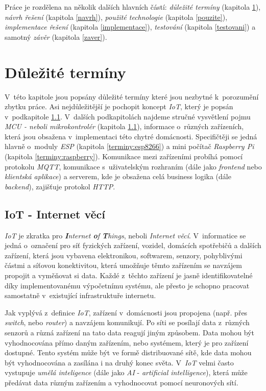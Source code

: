 Práce je rozdělena na několik dalších hlavních částí:
\emph{důležité termíny} (kapitola \ref{terminy}),
\emph{návrh řešení} (kapitola \ref{navrh}),
\emph{použité technologie} (kapitola \ref{pouzite}),
\emph{implementace řešení} (kapitola \ref{implementace}),
\emph{testování} (kapitola \ref{testovani})
a samotný \emph{závěr} (kapitola \ref{zaver}).

\chapter{Důležité termíny}
\label{terminy}

V~této kapitole jsou popsány důležité termíny které jsou nezbytné k~porozumění zbytku práce.
Asi nejdůležitější je pochopit koncept \emph{IoT}, který je popsán v~podkapitole \ref{terminy:iot}.
V~dalších podkapitolách najdeme stručné vysvětlení pojmu \emph{MCU - neboli mikrokontrolér} (kapitola \ref{terminy:iot}), informace o~různých zařízeních, která jsou obsažena v~implementaci této chytré domácnosti.
Specifičtěji se jedná hlavně o~moduly \emph{ESP} (kapitola \ref{terminy:esp8266}) a mini počítač \emph{Raspberry Pi} (kapitola \ref{terminy:raspberry}).
Komunikace mezi zařízeními probíhá pomocí protokolu \emph{MQTT}, komunikace s~uživatelským rozhraním (dále jako \emph{frontend} nebo \emph{klientská aplikace}) a serverem, kde je obsažena celá business logika (dále \emph{backend}), zajišťuje protokol \emph{HTTP}.

\bigskip

\section{IoT - Internet věcí}
\label{terminy:iot}

\emph{IoT} je zkratka pro \emph{\textbf{I}nternet \textbf{o}f \textbf{T}hings}, neboli \emph{Internet věcí}.
V~informatice se jedná o~označení pro síť fyzických zařízení, vozidel, domácích spotřebičů a dalších zařízení, která jsou vybavena elektronikou,
softwarem, senzory, pohyblivými částmi a síťovou konektivitou, která umožňuje těmto zařízením se navzájem propojit a vyměňovat si data.
Každé z~těchto zařízení je jasně identifikovatelné díky implementovanému výpočetnímu systému,
ale přesto je schopno pracovat samostatně v~existující infrastruktuře internetu.~\cite{wiki:iot}

Jak vyplývá z~definice \emph{IoT}, zařízení v~domácnosti jsou propojena (např. přes \emph{switch}, nebo \emph{router}) a navzájem komunikují.
Po síti se posílají data z~různých senzorů a různá zařízení na tato data reagují jiným způsobem.
Data mohou být vyhodnocována přímo daným zařízením, nebo systémem, který je pro zařízení dostupné.
Tento systém může být ve formě distribuované sítě, kde data mohou být vyhodnocována a zasílána i na druhý konec světa.
V~\emph{IoT} velmi často vystupuje \emph{umělá inteligence} (dále jako \emph{AI} - \emph{artificial intelligence}), která může předávat data různým zařízením a vyhodnocovat pomocí neuronových sítí.

